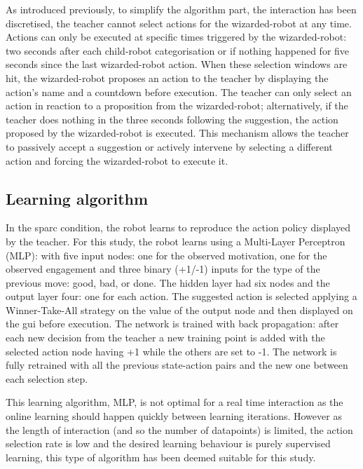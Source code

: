 As introduced previously, to simplify the algorithm part, the interaction has been discretised, the teacher cannot select actions for the wizarded-robot at any time. Actions can only be executed at specific times triggered by the wizarded-robot: two seconds after each child-robot categorisation or if nothing happened for five seconds since the last wizarded-robot action. When these selection windows are hit, the wizarded-robot proposes an action to the teacher by displaying the action's name and a countdown before execution. The teacher can only select an action in reaction to a proposition from the wizarded-robot; alternatively, if the teacher does nothing in the three seconds following the suggestion, the action proposed by the wizarded-robot is executed. This mechanism allows the teacher to passively accept a suggestion or actively intervene by selecting a different action and forcing the wizarded-robot to execute it.

\subsection{Learning algorithm}

In the \gls{sparc} condition, the robot learns to reproduce the action policy displayed by the teacher. For this study, the robot learns using a Multi-Layer Perceptron (MLP): with five input nodes: one for the observed motivation, one for the observed engagement and three binary (+1/-1) inputs for the type of the previous move: good, bad, or done. The hidden layer had six nodes and the output layer four: one for each action. The suggested action is selected applying a Winner-Take-All strategy on the value of the output node and then displayed on the \gls{gui} before execution. The network is trained with back propagation: after each new decision from the teacher a new training point is added with the selected action node having +1 while the others are set to -1. The network is fully retrained with all the previous state-action pairs and the new one between each selection step. 

This learning algorithm, MLP, is not optimal for a real time interaction as the online learning should happen quickly between learning iterations. However as the length of interaction (and so the number of datapoints) is limited, the action selection rate is low and the desired learning behaviour is purely supervised learning, this type of algorithm has been deemed suitable for this study.

